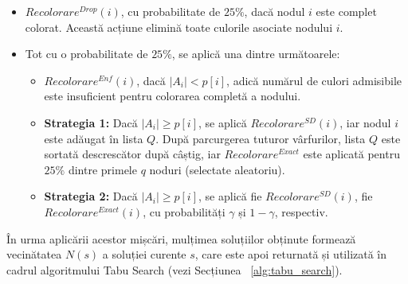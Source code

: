 \begin{itemize}
\item \textbf{$Recolorare^{Drop}(i)$}, cu probabilitate de $25\%$, dacă nodul $i$ este complet colorat. Această acțiune elimină toate culorile asociate nodului $i$.
 \item Tot cu o probabilitate de $25\%$, se aplică una dintre următoarele:
\begin{itemize}
    \item \textbf{$Recolorare^{Enf}(i)$}, dacă $|A_i| < p[i]$, adică numărul de culori admisibile este insuficient pentru colorarea completă a nodului.
    
    \item \textbf{Strategia 1:} Dacă $|A_i| \geq p[i]$, se aplică $Recolorare^{SD}(i)$, iar nodul $i$ este adăugat în lista $Q$. După parcurgerea tuturor vârfurilor, lista $Q$ este sortată descrescător după câștig, iar $Recolorare^{Exact}$ este aplicată pentru $25\%$ dintre primele $q$ noduri (selectate aleatoriu).
    
    \item \textbf{Strategia 2:} Dacă $|A_i| \geq p[i]$, se aplică fie $Recolorare^{SD}(i)$, fie \\
    $Recolorare^{Exact}(i)$, cu probabilități $\gamma$ și $1 - \gamma$, respectiv.
\end{itemize}
\end{itemize}
În urma aplicării acestor mișcări, mulțimea soluțiilor obținute formează vecinătatea $N(s)$ a soluției curente $s$, care este apoi returnată și utilizată în cadrul algoritmului Tabu Search (vezi Secțiunea ~\ref{alg:tabu_search}).


\begin{algorithm}[H]
\caption{$Recolorare^{exact}$ ($i$)}\label{alg:Rexact}
\begin{algorithmic}[1]
\small
{}
       
    \Else{}
        \Else{}
        \EndIf{}
        \EndIf{}
      \EndFor{}
        \EndIf{}
      \EndFor{}
    \EndIf{}
  \EndFor{}
\EndFor{}
\end{algorithmic}
\end{algorithm}

